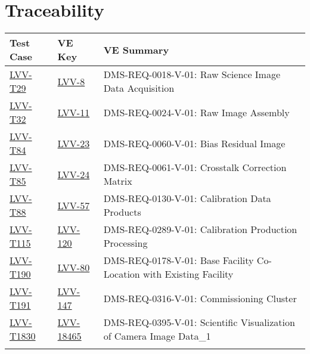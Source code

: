 \section{Traceability}

\begin{longtable}{p{3cm}p{3cm}L{9cm}}
\hline
\textbf{Test Case} & \textbf{VE Key} & \textbf{VE Summary} \\ \hline
\href{https://jira.lsstcorp.org/secure/Tests.jspa#/testCase/LVV-T29}{LVV-T29} &
  \href{https://jira.lsstcorp.org/browse/LVV-8}{LVV-8}
  & DMS-REQ-0018-V-01: Raw Science Image Data Acquisition
 \\ 
\hline
\href{https://jira.lsstcorp.org/secure/Tests.jspa#/testCase/LVV-T32}{LVV-T32} &
  \href{https://jira.lsstcorp.org/browse/LVV-11}{LVV-11}
  & DMS-REQ-0024-V-01: Raw Image Assembly
 \\ 
\hline
\href{https://jira.lsstcorp.org/secure/Tests.jspa#/testCase/LVV-T84}{LVV-T84} &
  \href{https://jira.lsstcorp.org/browse/LVV-23}{LVV-23}
  & DMS-REQ-0060-V-01: Bias Residual Image
 \\ 
\hline
\href{https://jira.lsstcorp.org/secure/Tests.jspa#/testCase/LVV-T85}{LVV-T85} &
  \href{https://jira.lsstcorp.org/browse/LVV-24}{LVV-24}
  & DMS-REQ-0061-V-01: Crosstalk Correction Matrix
 \\ 
\hline
\href{https://jira.lsstcorp.org/secure/Tests.jspa#/testCase/LVV-T88}{LVV-T88} &
  \href{https://jira.lsstcorp.org/browse/LVV-57}{LVV-57}
  & DMS-REQ-0130-V-01: Calibration Data Products
 \\ 
\hline
\href{https://jira.lsstcorp.org/secure/Tests.jspa#/testCase/LVV-T115}{LVV-T115} &
  \href{https://jira.lsstcorp.org/browse/LVV-120}{LVV-120}
  & DMS-REQ-0289-V-01: Calibration Production Processing
 \\ 
\hline
\href{https://jira.lsstcorp.org/secure/Tests.jspa#/testCase/LVV-T190}{LVV-T190} &
  \href{https://jira.lsstcorp.org/browse/LVV-80}{LVV-80}
  & DMS-REQ-0178-V-01: Base Facility Co-Location with Existing Facility
 \\ 
\hline
\href{https://jira.lsstcorp.org/secure/Tests.jspa#/testCase/LVV-T191}{LVV-T191} &
  \href{https://jira.lsstcorp.org/browse/LVV-147}{LVV-147}
  & DMS-REQ-0316-V-01: Commissioning Cluster
 \\ 
\hline
\href{https://jira.lsstcorp.org/secure/Tests.jspa#/testCase/LVV-T1830}{LVV-T1830} &
  \href{https://jira.lsstcorp.org/browse/LVV-18465}{LVV-18465}
  & DMS-REQ-0395-V-01: Scientific Visualization of Camera Image Data\_1
 \\ 
\hline
\end{longtable}
